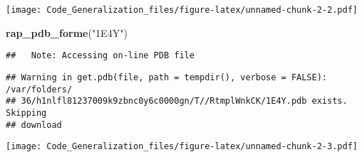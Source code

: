 \documentclass[]{article}
\newenvironment{Shaded}{\begin{snugshade}}{\end{snugshade}}
\newcommand{\KeywordTok}[1]{\textcolor[rgb]{0.13,0.29,0.53}{\textbf{#1}}}
\newcommand{\StringTok}[1]{\textcolor[rgb]{0.31,0.60,0.02}{#1}}
\newcommand{\NormalTok}[1]{#1}
\begin{document}
\texttt{[image: Code\_Generalization\_files/figure-latex/unnamed-chunk-2-2.pdf]}

\begin{Shaded}
\begin{Highlighting}[]
\KeywordTok{rap_pdb_forme}\NormalTok{(}\StringTok{"1E4Y"}\NormalTok{)}
\end{Highlighting}
\end{Shaded}

\begin{verbatim}
##   Note: Accessing on-line PDB file
\end{verbatim}

\begin{verbatim}
## Warning in get.pdb(file, path = tempdir(), verbose = FALSE): /var/folders/
## 36/h1nlfl81237009k9zbnc0y6c0000gn/T//RtmplWnkCK/1E4Y.pdb exists. Skipping
## download
\end{verbatim}

\texttt{[image: Code\_Generalization\_files/figure-latex/unnamed-chunk-2-3.pdf]}
\end{document}
